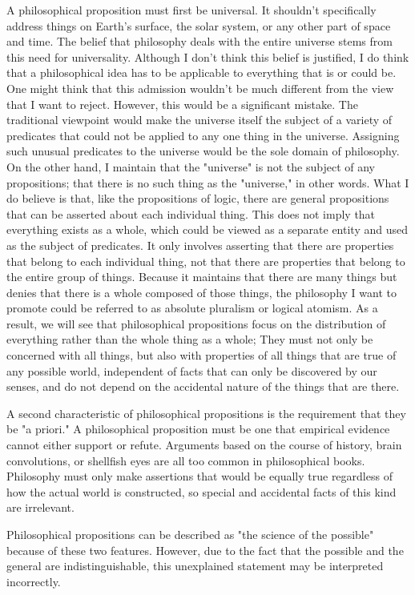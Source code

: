 \documentclass[a4paper,12pt]{book}[2004/02/16]
\theoremstyle{ilemma}
\theoremstyle{itheorem}
\theoremstyle{iother}
\theoremstyle{icorollary}
\theoremstyle{numcorollary}
\theoremstyle{idefinition}
\begin{document}
A philosophical proposition must first be universal. It shouldn't specifically address things on Earth's surface, the solar system, or any other part of space and time. The belief that philosophy deals with the entire universe stems from this need for universality. Although I don't think this belief is justified, I do think that a philosophical idea has to be applicable to everything that is or could be. One might think that this admission wouldn't be much different from the view that I want to reject. However, this would be a significant mistake. The traditional viewpoint would make the universe itself the subject of a variety of predicates that could not be applied to any one thing in the universe. Assigning such unusual predicates to the universe would be the sole domain of philosophy. On the other hand, I maintain that the "universe" is not the subject of any propositions; that there is no such thing as the "universe," in other words. What I do believe is that, like the propositions of logic, there are general propositions that can be asserted about each individual thing. This does not imply that everything exists as a whole, which could be viewed as a separate entity and used as the subject of predicates. It only involves asserting that there are properties that belong to each individual thing, not that there are properties that belong to the entire group of things. Because it maintains that there are many things but denies that there is a whole composed of those things, the philosophy I want to promote could be referred to as absolute pluralism or logical atomism. As a result, we will see that philosophical propositions focus on the distribution of everything rather than the whole thing as a whole;
They must not only be concerned with all things, but also with properties of all things that are true of any possible world, independent of facts that can only be discovered by our senses, and do not depend on the accidental nature of the things that are there.

A second characteristic of philosophical propositions is the requirement that they be "a priori." A philosophical proposition must be one that empirical evidence cannot either support or refute. Arguments based on the course of history, brain convolutions, or shellfish eyes are all too common in philosophical books. Philosophy must only make assertions that would be equally true regardless of how the actual world is constructed, so special and accidental facts of this kind are irrelevant.

Philosophical propositions can be described as "the science of the possible" because of these two features. However, due to the fact that the possible and the general are indistinguishable, this unexplained statement may be interpreted incorrectly.
\end{document}
